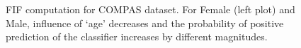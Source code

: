 \begin{figure}[t!]	
	\centering
	\vspace{-2ex}
	\caption[FIF computation using {\fvgm}]{FIF computation for COMPAS dataset. For Female (left plot) and Male, influence of `age' decreases and the probability of positive prediction of the classifier increases  by different magnitudes.}\label{fvgm_fig:influence function}
\end{figure}



